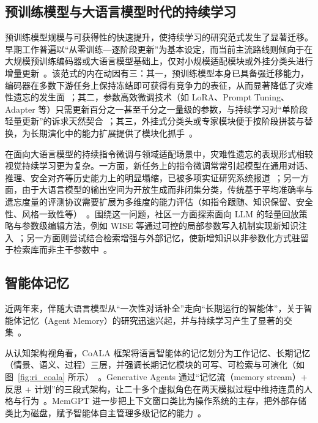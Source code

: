 \subsection{预训练模型与大语言模型时代的持续学习}

预训练模型规模与可获得性的快速提升，使持续学习的研究范式发生了显著迁移。早期工作普遍以“从零训练—逐阶段更新”为基本设定，而当前主流路线则倾向于在大规模预训练编码器或大语言模型基础上，仅对小规模适配模块或外挂分类头进行增量更新~\citep{wang2022dualprompt,hu2021lora,wang2023orthogonal,chen2024coin}。该范式的内在动因有三：其一，预训练模型本身已具备强迁移能力，编码器在多数下游任务上保持冻结即可获得有竞争力的表征，从而显著降低了灾难性遗忘的发生面~\citep{cossu2024continual,chee2023leveraging}；其二，参数高效微调技术（如 LoRA、Prompt Tuning、Adapter 等）只需更新百分之一甚至千分之一量级的参数，与持续学习对“单阶段轻量更新”的诉求天然契合~\citep{hu2021lora,wang2022dualprompt}；其三，外挂式分类头或专家模块便于按阶段拼装与替换，为长期演化中的能力扩展提供了模块化抓手~\citep{chen2024coin,wang2023orthogonal}。

在面向大语言模型的持续指令微调与领域适配场景中，灾难性遗忘的表现形式相较视觉持续学习更为复杂。一方面，新任务上的指令微调常常引起模型在通用对话、推理、安全对齐等历史能力上的明显塌缩，已被多项实证研究系统报道~\citep{luo2023empirical,shi2024llmcontinual,wang2024trace}；另一方面，由于大语言模型的输出空间为开放生成而非闭集分类，传统基于平均准确率与遗忘度量的评测协议需要扩展为多维度的能力评估（如指令跟随、知识保留、安全性、风格一致性等）~\citep{wang2025llm_cl_zh,wang2024trace}。围绕这一问题，社区一方面探索面向 LLM 的轻量回放策略与参数级编辑方法，例如 WISE 等通过可控的局部参数写入机制实现新知识注入~\citep{wang2024wise}；另一方面则尝试结合检索增强与外部记忆，使新增知识以非参数化方式驻留于检索库而非主干参数中~\citep{packer2023memgpt,chhikara2025mem0,xu2025amem}。


\subsection{智能体记忆}

近两年来，伴随大语言模型从“一次性对话补全”走向“长期运行的智能体”，关于智能体记忆（Agent Memory）的研究迅速兴起，并与持续学习产生了显著的交集~\citep{xi2023rise,wang2024llmagent,sumers2024coala}。

从认知架构视角看，CoALA 框架将语言智能体的记忆划分为工作记忆、长期记忆（情景、语义、过程）三层，并强调长期记忆模块的可写、可检索与可演化（如图~\ref{fig:ri_coala} 所示）~\citep{sumers2024coala}。Generative Agents 通过“记忆流（memory stream）+ 反思 + 计划”的三段式架构，让二十多个虚拟角色在两天模拟过程中维持连贯的人格与行为~\citep{park2023generative}。MemGPT 进一步把上下文窗口类比为操作系统的主存，把外部存储类比为磁盘，赋予智能体自主管理多级记忆的能力~\citep{packer2023memgpt}。

